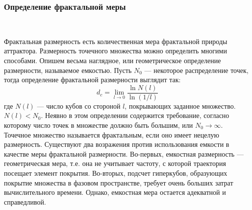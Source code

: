 \subsubsection{Определение фрактальной меры}
~\par
Фрактальная размерность есть количественная мера фрактальной природы аттрактора. Размерность точечного множества можно определить многими способами. Опишем весьма наглядное, или геометрическое определение размерности, называемое емкостью.
Пусть $N_0$ --- некоторое распределение точек, тогда определение фрактальной размерности выглядит так:
\begin{equation}\label{FRAC_RAZM_DEFINITION}
	d_c = \lim_{l \to  0} \frac{   \ln{N(l)}   }{   \ln{(1/l)}   }
\end{equation}
где $N(l)$ --- число кубов со стороной $l$, покрывающих заданное множество. $N(l) < N_0$.
Неявно в этом определении содержится требование, согласно которому число точек в множестве должно быть большим, или $N_0 \to \infty$.\\
Точечное множество называется фрактальным, если оно имеет нецелую размерность. 
Существуют два возражения против использования емкости в качестве меры фрактальной размерности. Во-первых, емкостная размерность --- геометрическая мера, т.е. она не учитывает частоту, с которой траектория посещает элемент покрытия. Во-вторых, подсчет гиперкубов, образующих покрытие множества в фазовом пространстве, требует очень больших затрат вычислительного времени. Однако, емкостная мера остается адекватной и справедливой.~\cite{Mun}

